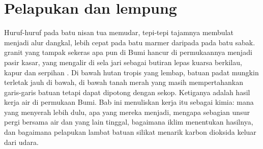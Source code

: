 \chapter{Pelapukan dan lempung}\label{ch:b1:weathering-clays}

Huruf-huruf pada batu nisan tua memudar, tepi-tepi tajamnya membulat menjadi alur dangkal, lebih cepat pada batu marmer daripada pada batu sabak.  granit yang tampak sekeras apa pun di Bumi hancur di permukaannya menjadi pasir kasar, yang mengalir di sela jari sebagai butiran lepas kuarsa berkilau,  kapur dan serpihan . Di bawah hutan tropis yang lembap, batuan padat mungkin terletak jauh di bawah, di bawah tanah merah yang masih mempertahankan garis-garis  batuan tetapi dapat dipotong dengan sekop. Ketiganya adalah hasil kerja air di permukaan Bumi. Bab ini menuliskan kerja itu sebagai kimia:  mana yang menyerah lebih dulu, apa yang mereka menjadi, mengapa sebagian unsur pergi bersama air dan yang lain tinggal, bagaimana iklim menentukan hasilnya, dan bagaimana pelapukan lambat batuan silikat menarik karbon dioksida keluar dari udara.

